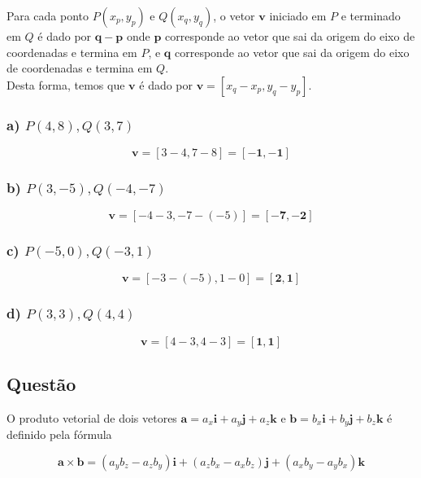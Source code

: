 \documentclass[a4paper,11pt,pagenumber=true]{article}
\newcommand{\vecv}{$\mathbf{v}$}
\newcommand{\vecp}{$\mathbf{p}$}
\newcommand{\vecq}{$\mathbf{q}$}
\theoremstyle{mytheor}
\begin{document}
            Para cada ponto $P(x_p, y_p)$ e $Q(x_q, y_q)$, o vetor \vecv{} iniciado em $P$ e terminado em $Q$ é dado por $\mathbf{q}-\mathbf{p}$ onde \vecp{} corresponde ao vetor que sai da origem do eixo de coordenadas e termina em $P$, e \vecq{} corresponde ao vetor que sai da origem do eixo de coordenadas e termina em $Q$.\\
            
            Desta forma, temos que \vecv{} é dado por $\mathbf{v} = [x_q-x_p, y_q-y_p]$.
            
            \subsubsection*{a) $P(4, 8), Q(3, 7)$}
            \[\mathbf{v} = [3-4, 7-8] = \mathbf{[-1, -1]}\]
            
            \subsubsection*{b) $P(3, -5), Q(-4, -7)$}
            \[\mathbf{v} = [-4-3, -7-(-5)] = \mathbf{[-7, -2]}\]
            
            \subsubsection*{c) $P(-5, 0), Q(-3, 1)$}
            \[\mathbf{v} = [-3-(-5), 1-0] = \mathbf{[2, 1]}\]
            
            \subsubsection*{d) $P(3, 3), Q(4, 4)$}
            \[\mathbf{v} = [4-3, 4-3] = \mathbf{[1, 1]}\]

        \subsection{Questão }
        
            O produto vetorial de dois vetores 
            $\mathbf{a} = a_x\mathbf{i} + a_y\mathbf{j} + a_z\mathbf{k}$ e 
            $\mathbf{b} = b_x\mathbf{i} + b_y\mathbf{j} + b_z\mathbf{k}$ é definido pela fórmula
            
            \begin{equation}\label{eq:cross-product}
                \mathbf{a}\times\mathbf{b} = 
                    (a_y b_z - a_z b_y)\mathbf{i} + 
                    (a_z b_x - a_x b_z)\mathbf{j} + 
                    (a_x b_y - a_y b_x)\mathbf{k}                 
            \end{equation}
    
\end{document}
